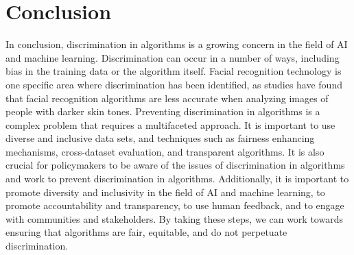 \documentclass[
	12pt,
    a4paper,
    egregdoesnotlikesansseriftitles, %
    toc=chapterentrywithdots,
    oneside, openany,
    titlepage,
    parskip=half,
    headings=normal,  %
    listof=totoc,
    bibliography=totocnumbered,
    index=totoc,
    captions=tableheading,  %
    listof=flat,
    numbers=noenddot, %
    final]
    {scrbook}
\begin{document}
\chapter{Conclusion}
In conclusion, discrimination in algorithms is a growing concern in the field of AI and machine learning. 
Discrimination can occur in a number of ways, including bias in the training data or the algorithm itself. 
Facial recognition technology is one specific area where discrimination has been identified, as studies have found that facial recognition algorithms are less accurate when analyzing images of people with darker skin tones. 
Preventing discrimination in algorithms is a complex problem that requires a multifaceted approach. 
It is important to use diverse and inclusive data sets, and techniques such as fairness enhancing mechanisms, cross-dataset evaluation, and transparent algorithms. 
It is also crucial for policymakers to be aware of the issues of discrimination in algorithms and work to prevent discrimination in algorithms. 
Additionally, it is important to promote diversity and inclusivity in the field of AI and machine learning, to promote accountability and transparency, to use human feedback, and to engage with communities and stakeholders. 
By taking these steps, we can work towards ensuring that algorithms are fair, equitable, and do not perpetuate discrimination.







\backmatter


%
%
%
\printbibliography

\clearpage %




\end{document}
